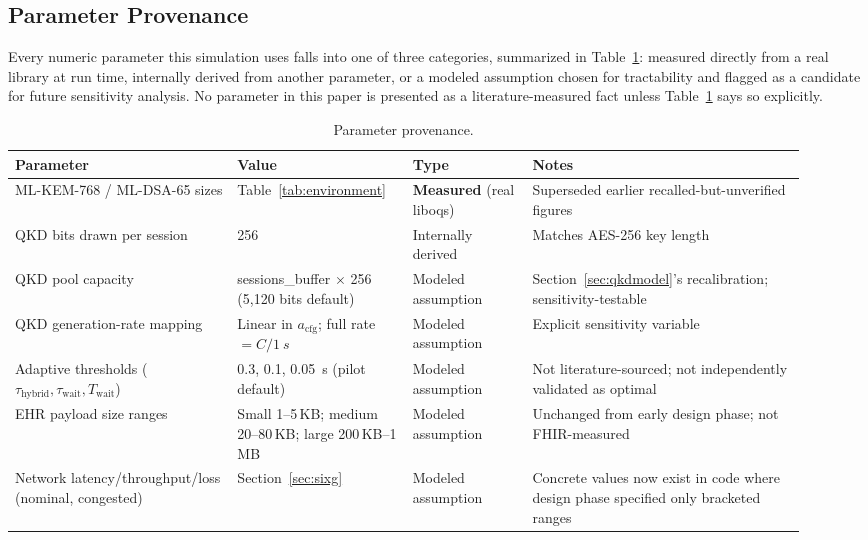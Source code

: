\documentclass[journal]{IEEEtran}
\newcommand{\acfg}{\ensuremath{a_{\text{cfg}}}}
\begin{document}
\subsection{Parameter Provenance}
\label{sec:provenance}

Every numeric parameter this simulation uses falls into one of three categories, summarized in Table~\ref{tab:provenance}: measured directly from a real library at run time, internally derived from another parameter, or a modeled assumption chosen for tractability and flagged as a candidate for future sensitivity analysis. No parameter in this paper is presented as a literature-measured fact unless Table~\ref{tab:provenance} says so explicitly.

\begin{table}[t]
\centering
\caption{Parameter provenance.}
\label{tab:provenance}
\small
\begin{tabular}{@{}p{0.26\linewidth}p{0.20\linewidth}p{0.14\linewidth}p{0.32\linewidth}@{}}
\toprule
Parameter & Value & Type & Notes \\
\midrule
ML-KEM-768 / ML-DSA-65 sizes & Table~\ref{tab:environment} & \textbf{Measured} (real liboqs) & Superseded earlier recalled-but-unverified figures \\
QKD bits drawn per session & 256 & Internally derived & Matches AES-256 key length \\
QKD pool capacity & sessions\_buffer $\times$ 256 (5{,}120 bits default) & Modeled assumption & Section~\ref{sec:qkdmodel}'s recalibration; sensitivity-testable \\
QKD generation-rate mapping & Linear in $\acfg$; full rate $= C/\qty{1}{s}$ & Modeled assumption & Explicit sensitivity variable \\
Adaptive thresholds ($\tau_{\text{hybrid}}, \tau_{\text{wait}}, T_{\text{wait}}$) & 0.3, 0.1, \qty{0.05}{s} (pilot default) & Modeled assumption & Not literature-sourced; not independently validated as optimal \\
EHR payload size ranges & Small 1--5\,KB; medium 20--80\,KB; large 200\,KB--1\,MB & Modeled assumption & Unchanged from early design phase; not FHIR-measured \\
Network latency/throughput/loss (nominal, congested) & Section~\ref{sec:sixg} & Modeled assumption & Concrete values now exist in code where design phase specified only bracketed ranges \\
\bottomrule
\end{tabular}
\end{table}
\end{document}

